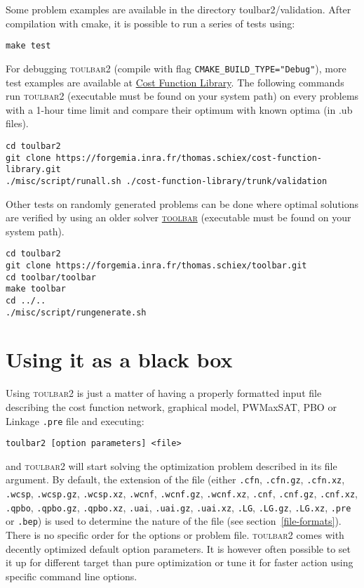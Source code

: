 \documentclass{article}
\def\toulbar2{\textsc{toulbar2}}
\def\toolbar{\textsc{toolbar}}
\begin{document}
Some problem examples are available in the directory {\sf toulbar2/validation}. After compilation with cmake, it is possible to run a series of tests using:
\begin{verbatim}
make test
\end{verbatim}

For debugging \toulbar2 (compile with flag \verb!CMAKE_BUILD_TYPE="Debug"!), more test examples are available at \href{https://forgemia.inra.fr/thomas.schiex/cost-function-library}{Cost Function Library}.
The following commands run \toulbar2 (executable must be found on your system path) on every problems with a 1-hour time limit and compare their optimum with known optima (in .ub files).
\begin{verbatim}
cd toulbar2
git clone https://forgemia.inra.fr/thomas.schiex/cost-function-library.git
./misc/script/runall.sh ./cost-function-library/trunk/validation
\end{verbatim}

Other tests on randomly generated problems can be done where optimal solutions are verified by using an older solver \href{https://forgemia.inra.fr/thomas.schiex/toolbar}{\toolbar} (executable must be found on your system path).
\begin{verbatim}
cd toulbar2
git clone https://forgemia.inra.fr/thomas.schiex/toolbar.git
cd toolbar/toolbar
make toolbar
cd ../..
./misc/script/rungenerate.sh
\end{verbatim}

\section{Using it as a black box}

Using \toulbar2 is just a matter of having a properly formatted input
file describing the cost function network, graphical model, PWMaxSAT,
PBO or Linkage \texttt{.pre} file and executing:

\begin{verbatim}
toulbar2 [option parameters] <file>
\end{verbatim}

and \toulbar2 will start solving the optimization problem described in
its file argument. By default, the extension of the file (either
\texttt{.cfn}, \texttt{.cfn.gz}, \texttt{.cfn.xz}, \texttt{.wcsp}, \texttt{.wcsp.gz}, \texttt{.wcsp.xz},
\texttt{.wcnf}, \texttt{.wcnf.gz}, \texttt{.wcnf.xz}, \texttt{.cnf}, \texttt{.cnf.gz}, \texttt{.cnf.xz}, \texttt{.qpbo}, \texttt{.qpbo.gz}, \texttt{.qpbo.xz},
\texttt{.uai}, \texttt{.uai.gz}, \texttt{.uai.xz}, \texttt{.LG}, \texttt{.LG.gz}, \texttt{.LG.xz}, \texttt{.pre} or \texttt{.bep}) is used
to determine the nature of the file (see
section~\ref{file-formats}). There is no specific order for the
options or problem file. \toulbar2 comes with decently optimized
default option parameters. It is however often possible to set it up
for different target than pure optimization or tune it for faster
action using specific command line options.
\end{document}
